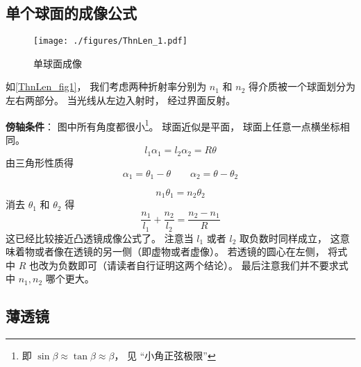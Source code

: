 


\subsection{单个球面的成像公式}
\begin{figure}[ht]
\centering
\texttt{[image: ./figures/ThnLen\_1.pdf]}
\caption{单球面成像} \label{ThnLen_fig1}
\end{figure}

如\autoref{ThnLen_fig1}， 我们考虑两种折射率分别为 $n_1$ 和 $n_2$ 得介质被一个球面划分为左右两部分。 当光线从左边入射时， 经过界面反射。

\textbf{傍轴条件}： 图中所有角度都很小\footnote{即 $\sin\beta \approx \tan\beta \approx \beta$， 见 “小角正弦极限”}。 球面近似是平面， 球面上任意一点横坐标相同。
\begin{equation}
l_1 \alpha_1 = l_2 \alpha_2 = R\theta
\end{equation}
由三角形性质得
\begin{equation}
\alpha_1 = \theta_1 - \theta \qquad
\alpha_2 = \theta - \theta_2
\end{equation}

\begin{equation}
n_1 \theta_1 = n_2 \theta_2
\end{equation}
消去 $\theta_1$ 和 $\theta_2$ 得
\begin{equation}
\frac{n_1}{l_1} + \frac{n_2}{l_2} = \frac{n_2 - n_1}{R}
\end{equation}
这已经比较接近凸透镜成像公式了。 注意当 $l_1$ 或者 $l_2$ 取负数时同样成立， 这意味着物或者像在透镜的另一侧（即虚物或者虚像）。 若透镜的圆心在左侧， 将式中 $R$ 也改为负数即可（请读者自行证明这两个结论）。 最后注意我们并不要求式中 $n_1, n_2$ 哪个更大。

\subsection{薄透镜}

